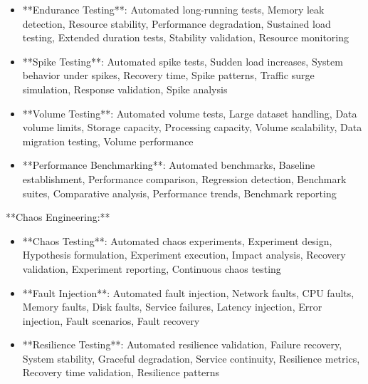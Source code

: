 \documentclass[11pt,a4paper]{article}
\begin{document}
\begin{itemize}
\item **Endurance Testing**: Automated long-running tests, Memory leak detection, Resource stability, Performance degradation, Sustained load testing, Extended duration tests, Stability validation, Resource monitoring
\end{itemize}

\begin{itemize}
\item **Spike Testing**: Automated spike tests, Sudden load increases, System behavior under spikes, Recovery time, Spike patterns, Traffic surge simulation, Response validation, Spike analysis
\end{itemize}

\begin{itemize}
\item **Volume Testing**: Automated volume tests, Large dataset handling, Data volume limits, Storage capacity, Processing capacity, Volume scalability, Data migration testing, Volume performance
\end{itemize}

\begin{itemize}
\item **Performance Benchmarking**: Automated benchmarks, Baseline establishment, Performance comparison, Regression detection, Benchmark suites, Comparative analysis, Performance trends, Benchmark reporting
\end{itemize}

**Chaos Engineering:**

\begin{itemize}
\item **Chaos Testing**: Automated chaos experiments, Experiment design, Hypothesis formulation, Experiment execution, Impact analysis, Recovery validation, Experiment reporting, Continuous chaos testing
\end{itemize}

\begin{itemize}
\item **Fault Injection**: Automated fault injection, Network faults, CPU faults, Memory faults, Disk faults, Service failures, Latency injection, Error injection, Fault scenarios, Fault recovery
\end{itemize}

\begin{itemize}
\item **Resilience Testing**: Automated resilience validation, Failure recovery, System stability, Graceful degradation, Service continuity, Resilience metrics, Recovery time validation, Resilience patterns
\end{itemize}
\end{document}
